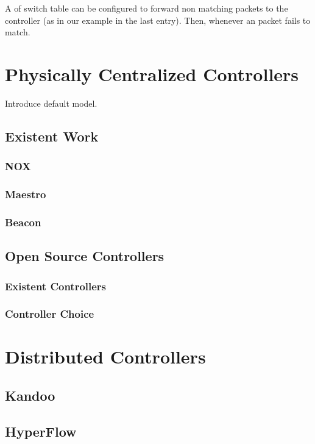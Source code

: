 A \gls{of} switch table can be configured to forward non matching packets to the controller (as in our example in the last entry). Then, whenever an packet fails to match. 
\glsresetall

\section{Physically Centralized Controllers}
\label{sec:related:phys-centr-contr}
Introduce default model. 

\subsection{Existent Work}
\subsubsection{NOX}
\subsubsection{Maestro}
\subsubsection{Beacon}

\glsresetall
\subsection{Open Source Controllers}
\subsubsection{Existent Controllers}
\subsubsection{Controller Choice}

\glsresetall
\section{Distributed Controllers}
\label{sec:related:distr-contr}
\subsection{Kandoo}
\label{sec:related:kandoo}
\subsection{HyperFlow}
\label{sec:related:hyperflow}
